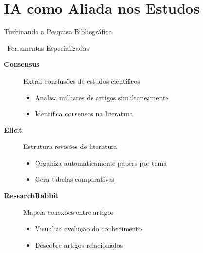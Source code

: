 \documentclass[aspectratio=169,12pt]{beamer}
\begin{document}
\section{IA como Aliada nos Estudos}

\begin{frame}{Turbinando a Pesquisa Bibliográfica}
    \begin{block}{\faSearch\, Ferramentas Especializadas}
        \begin{description}
            \item[\textcolor{accent}{\faChartLine} \textbf{Consensus}] Extrai conclusões de estudos científicos
            \begin{itemize}
                \item Analisa milhares de artigos simultaneamente
                \item Identifica consensos na literatura
            \end{itemize}
            
            \item[\textcolor{secondary}{\faSitemap} \textbf{Elicit}] Estrutura revisões de literatura
            \begin{itemize}
                \item Organiza automaticamente papers por tema
                \item Gera tabelas comparativas
            \end{itemize}
            
            \item[\textcolor{success}{\faLink} \textbf{ResearchRabbit}] Mapeia conexões entre artigos
            \begin{itemize}
                \item Visualiza evolução do conhecimento
                \item Descobre artigos relacionados
            \end{itemize}
        \end{description}
    \end{block}
\end{frame}
\end{document}
